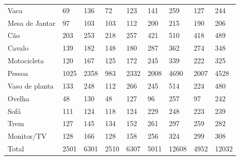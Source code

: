 \begin{table}[H]
\begin{tabular}{l|l|l|l|l|l|l|ll}
		Vaca           & 69           & 136          & 72             & 123           & 141               & 259               & \multicolumn{1}{l|}{127}     & 244     \\
		Mesa de Jantar & 97           & 103          & 103            & 112           & 200               & 215               & \multicolumn{1}{l|}{190}     & 206     \\
		Cão            & 203          & 253          & 218            & 257           & 421               & 510               & \multicolumn{1}{l|}{418}     & 489     \\
		Cavalo         & 139          & 182          & 148            & 180           & 287               & 362               & \multicolumn{1}{l|}{274}     & 348     \\
		Motocicleta    & 120          & 167          & 125            & 172           & 245               & 339               & \multicolumn{1}{l|}{222}     & 325     \\
		Pessoa         & 1025         & 2358         & 983            & 2332          & 2008              & 4690              & \multicolumn{1}{l|}{2007}    & 4528    \\
		Vaso de planta & 133          & 248          & 112            & 266           & 245               & 514               & \multicolumn{1}{l|}{224}     & 480     \\
		Ovelha         & 48           & 130          & 48             & 127           & 96                & 257               & \multicolumn{1}{l|}{97}      & 242     \\
		Sofá           & 111          & 124          & 118            & 124           & 229               & 248               & \multicolumn{1}{l|}{223}     & 239     \\
		Trem           & 127          & 145          & 134            & 152           & 261               & 297               & \multicolumn{1}{l|}{259}     & 282     \\
		Monitor/TV     & 128          & 166          & 128            & 158           & 256               & 324               & \multicolumn{1}{l|}{299}     & 308     \\
		Total          & 2501         & 6301         & 2510           & 6307          & 5011              & 12608             & \multicolumn{1}{l|}{4952}    & 12032  
	\end{tabular}
	\\
\end{table}

